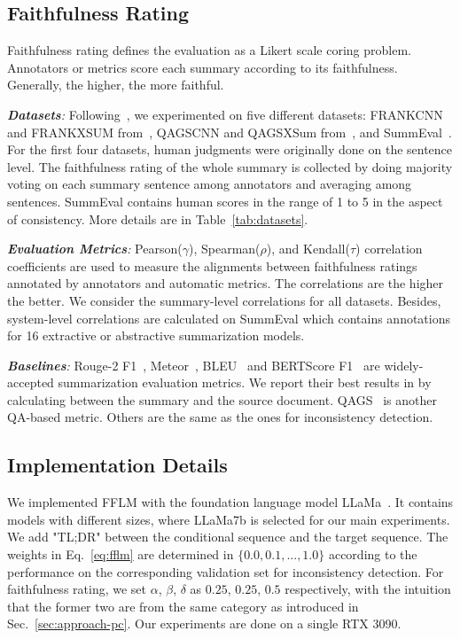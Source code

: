 \subsection{Faithfulness Rating}

Faithfulness rating defines the evaluation as a Likert scale coring problem. Annotators or metrics score each summary according to its faithfulness. Generally, the higher, the more faithful.


\textit{\textbf{Datasets}:} Following~\citet{son2022harim}, 
we experimented on five different datasets: FRANKCNN and FRANKXSUM 
from~\citet{pagnoni2021understanding}, QAGSCNN and QAGSXSum 
from~\citet{wang2020asking}, and SummEval~\cite{fabbri2021summeval}. 
For the first four datasets, human judgments were originally done on 
the sentence level. The faithfulness rating of the whole summary is 
collected by doing majority voting on each summary sentence among annotators 
and averaging among sentences. SummEval contains human scores in the range of
1 to 5 in the aspect of consistency. More details are in Table~\ref{tab:datasets}.

\textit{\textbf{Evaluation Metrics}:}
Pearson($\gamma$), Spearman($\rho$), and Kendall($\tau$) correlation coefficients are used to measure the alignments between faithfulness ratings annotated by annotators and automatic metrics. The correlations are the higher the better. We consider the summary-level correlations for all datasets. Besides, system-level correlations are calculated on SummEval which
contains annotations for 16 extractive or abstractive summarization models.

\textit{\textbf{Baselines}:} Rouge-2 F1~\cite{lin2004rouge}, Meteor~\cite{banerjee2005meteor}, BLEU~\cite{papineni2002bleu} and BERTScore F1~\cite{zhangbertscore} are widely-accepted summarization evaluation metrics. We report their best results in \citet{son2022harim} by calculating between the summary and the source document. QAGS~\cite{wang2020asking} is another QA-based metric. Others are the same as the ones for inconsistency detection. 

\subsection{Implementation Details}
We implemented FFLM with the foundation language model LLaMa~\cite{touvron2023llama}. It contains models with different sizes, where LLaMa7b is selected for our main experiments. We add "TL;DR" between the conditional sequence and the target sequence. The weights in Eq.~\ref{eq:fflm} are determined in $\{0.0, 0.1, ..., 1.0\}$ according to the performance on the corresponding validation set for inconsistency detection. For faithfulness rating, we set $\alpha$, $\beta$, $\delta$ as $0.25$, $0.25$, $0.5$ respectively, with the intuition that the former two are from the same category as introduced in Sec.~\ref{sec:approach-pc}. Our experiments are done on a single RTX 3090. %

